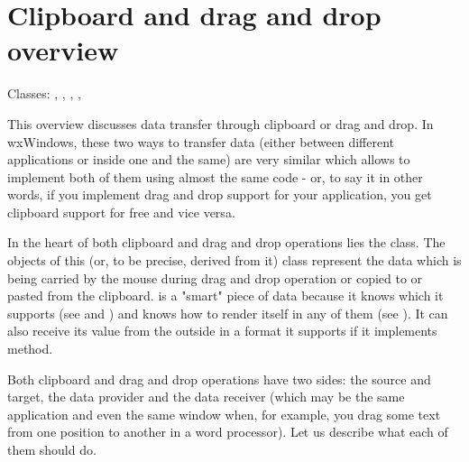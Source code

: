 
\section{Clipboard and drag and drop overview}\label{wxclipboardonfigoverview}

Classes: ,
         ,
         ,
         ,

This overview discusses data transfer through clipboard or drag and drop. In
wxWindows, these two ways to transfer data (either between different
applications or inside one and the same) are very similar which allows to
implement both of them using almost the same code - or, to say it in other
words, if you implement drag and drop support for your application, you get
clipboard support for free and vice versa.

In the heart of both clipboard and drag and drop operations lies the 
 class. The objects of this (or, to be
precise, derived from it) class represent the data which is being carried by
the mouse during drag and drop operation or copied to or pasted from the
clipboard.  is a "smart" piece of data
because it knows which  it supports (see 
 and 
) and knows how to render
itself in any of them (see ).
It can also receive its value from the outside in a format it supports if it
implements  method.

Both clipboard and drag and drop operations have two sides: the source and
target, the data provider and the data receiver (which may be the same
application and even the same window when, for example, you drag some text from
one position to another in a word processor). Let us describe what each of them
should do.

